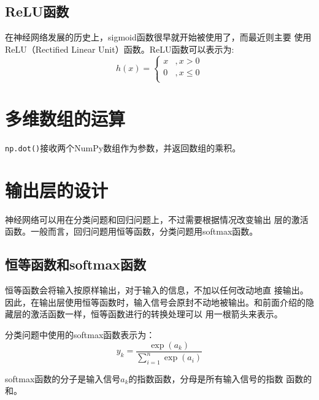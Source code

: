 \subsection{ReLU函数}
在神经网络发展的历史上，sigmoid函数很早就开始被使用了，而最近则主要
使用ReLU（Rectified Linear Unit）函数。ReLU函数可以表示为:
\begin{equation}
    h(x)=\left\{
    \begin{array}{ll}
        x & , x>0     \\
        0 & , x\leq 0 \\
    \end{array}
    \right.
\end{equation}
\section{多维数组的运算}
\verb|np.dot()|接收两个NumPy数组作为参数，并返回数组的乘积。

\section{输出层的设计}
神经网络可以用在分类问题和回归问题上，不过需要根据情况改变输出
层的激活函数。一般而言，回归问题用恒等函数，分类问题用softmax函数。
\subsection{恒等函数和softmax函数}
恒等函数会将输入按原样输出，对于输入的信息，不加以任何改动地直
接输出。因此，在输出层使用恒等函数时，输入信号会原封不动地被输出。和前面介绍的隐藏层的激活函数一样，恒等函数进行的转换处理可以
用一根箭头来表示。

分类问题中使用的softmax函数表示为：
\begin{equation}
    y_k=\frac{\exp(a_k)}{\sum\limits_{i=1}^n{\exp(a_i)}}
\end{equation}

softmax函数的分子是输入信号$a_k$的指数函数，分母是所有输入信号的指数
函数的和。